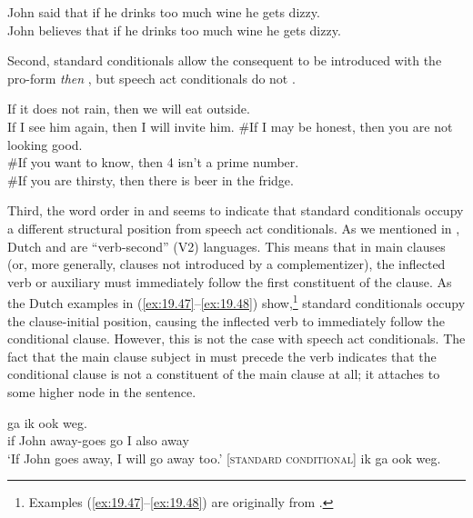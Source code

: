 \ea \label{ex:19.43}
   \z
\ex \label{ex:19.44}
\ea  John said that if he drinks too much wine he gets dizzy.\\
\ex John believes that if he drinks too much wine he gets dizzy.
                       \z
\z


Second, standard conditionals allow the consequent to be introduced with the pro-form \textit{then} , but speech act conditionals do not .


\ea \label{ex:19.45}
\ea  If it does not rain, then we will eat outside.\\
\ex If I see him again, then I will invite him.
                       \z
\ex \label{ex:19.46}
\ea \#If I may be honest, then you are not looking good.\\
\ex \#If you want to know, then 4 isn’t a prime number.\\
\ex \#If you are thirsty, then there is beer in the fridge.
                       \z
\z


Third, the word order in  and  seems to indicate that standard conditionals occupy a different structural position from speech act conditionals. As we mentioned in , Dutch and  are “verb-second” (V2) languages. This means that in main clauses (or, more generally, clauses not introduced by a complementizer), the inflected verb or auxiliary must immediately follow the first constituent of the clause. As the Dutch examples in (\ref{ex:19.47}--\ref{ex:19.48}) show,\footnote{Examples (\ref{ex:19.47}--\ref{ex:19.48}) are originally from \citet[ch. 2]{Iatridou1991}.} standard conditionals occupy the clause-initial position, causing the inflected verb to immediately follow the conditional clause. However, this is not the case with speech act conditionals. The fact that the main clause subject in  must precede the verb indicates that the conditional clause is not a constituent of the main clause at all; it attaches to some higher node in the sentence.


\ea \label{ex:19.47}
\ea  {}  ga  ik  ook  weg.\\
 if  John  away-goes  go  I  also  away\\
\glt ‘If John goes away, I will go away too.’ \hfill    [\textsc{standard conditional}]
 ik ga ook weg.
\z \z

